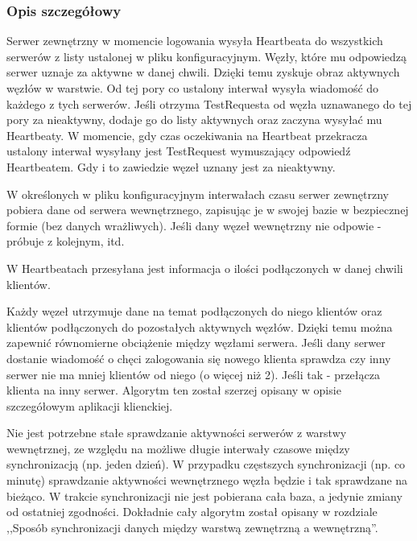 {\subsubsection*[Opis szczegółowy]{Opis szczegółowy}
\par{Serwer zewnętrzny w momencie logowania wysyła Heartbeata do wszystkich serwerów z listy ustalonej w pliku konfiguracyjnym. Węzły, które mu odpowiedzą serwer uznaje za aktywne w danej chwili. Dzięki temu zyskuje obraz aktywnych węzłów w warstwie. Od tej pory co ustalony interwał wysyła wiadomość do każdego z tych serwerów. Jeśli otrzyma TestRequesta od węzła uznawanego do tej pory za nieaktywny, dodaje go do listy aktywnych oraz zaczyna wysyłać mu Heartbeaty. W momencie, gdy czas oczekiwania na Heartbeat przekracza ustalony interwał wysyłany jest TestRequest wymuszający odpowiedź Heartbeatem. Gdy i to zawiedzie węzeł uznany jest za nieaktywny.}

\par{W określonych w pliku konfiguracyjnym interwałach czasu serwer zewnętrzny pobiera dane od serwera wewnętrznego, zapisując je w swojej bazie w bezpiecznej formie (bez danych wrażliwych). Jeśli dany węzeł wewnętrzny nie odpowie - próbuje z kolejnym, itd.}

\par{W Heartbeatach przesyłana jest informacja o ilości podłączonych w danej chwili klientów.}

\par{Każdy węzeł utrzymuje dane na temat podłączonych do niego klientów oraz klientów podłączonych do pozostałych aktywnych węzłów. Dzięki temu można zapewnić równomierne obciążenie między węzłami serwera. Jeśli dany serwer dostanie wiadomość o chęci zalogowania się nowego klienta sprawdza czy inny serwer nie ma mniej klientów od niego (o więcej niż 2). Jeśli tak - przełącza klienta na inny serwer. Algorytm ten został szerzej opisany w opisie szczegółowym aplikacji klienckiej.}

\par{Nie jest potrzebne stałe sprawdzanie aktywności serwerów z warstwy wewnętrznej, ze względu na możliwe długie interwały czasowe między synchronizacją (np. jeden dzień). W przypadku częstszych synchronizacji (np. co minutę) sprawdzanie aktywności wewnętrznego węzła będzie i tak sprawdzane na bieżąco. W trakcie synchronizacji nie jest pobierana cała baza, a jedynie zmiany od ostatniej zgodności. Dokładnie cały algorytm został opisany w rozdziale ,,Sposób synchronizacji danych między warstwą zewnętrzną a wewnętrzną''.}

}
